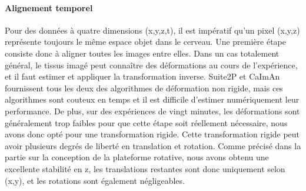 

\paragraph{Alignement temporel}


Pour des données à quatre dimensions (x,y,z,t), il est impératif qu'un pixel (x,y,z) représente toujours le même espace objet dans le cerveau. Une première étape consiste donc à aligner toutes les images entre elles. Dans un cas totalement général, le tissus imagé peut connaître des déformations au cours de l'expérience, et il faut estimer et appliquer la transformation inverse. Suite2P et CaImAn fournissent tous les deux des algorithmes de déformation non rigide, mais ces algorithmes sont couteux en temps et il est difficile d'estimer numériquement leur performance. De plus, sur des expériences de vingt minutes, les déformations sont généralement trop faibles pour que cette étape soit réellement nécessaire, nous avons donc opté pour une transformation rigide. Cette transformation rigide peut avoir plusieurs degrés de liberté en translation et rotation. Comme précisé dans la partie sur la conception de la plateforme rotative, nous avons obtenu une excellente stabilité en z, les translations restantes sont donc uniquement selon (x,y), et les rotations sont également négligeables. 

